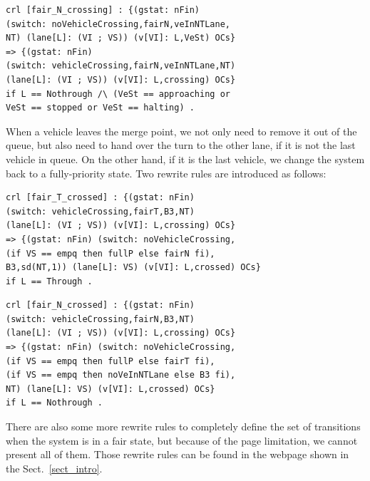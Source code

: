 \documentclass[10pt, conference, compsocconf]{IEEEtran}
\begin{document}
\begin{small}
	\begin{verbatim}
crl [fair_N_crossing] : {(gstat: nFin) 
(switch: noVehicleCrossing,fairN,veInNTLane,
NT) (lane[L]: (VI ; VS)) (v[VI]: L,VeSt) OCs} 
=> {(gstat: nFin) 
(switch: vehicleCrossing,fairN,veInNTLane,NT) 
(lane[L]: (VI ; VS)) (v[VI]: L,crossing) OCs} 
if L == Nothrough /\ (VeSt == approaching or 
VeSt == stopped or VeSt == halting) .
\end{verbatim}
\end{small}

When a vehicle leaves the merge point, we not only need to remove it out of the queue, but also need to hand over the turn to the other lane, if it is not the last vehicle in queue.
On the other hand, if it is the last vehicle, we change the system back to a fully-priority state.
Two rewrite rules are introduced as follows:

\begin{small}
\begin{verbatim}
crl [fair_T_crossed] : {(gstat: nFin) 
(switch: vehicleCrossing,fairT,B3,NT) 
(lane[L]: (VI ; VS)) (v[VI]: L,crossing) OCs} 
=> {(gstat: nFin) (switch: noVehicleCrossing,
(if VS == empq then fullP else fairN fi), 
B3,sd(NT,1)) (lane[L]: VS) (v[VI]: L,crossed) OCs} 
if L == Through .
\end{verbatim}
\end{small}

\begin{small}
	\begin{verbatim}
crl [fair_N_crossed] : {(gstat: nFin) 
(switch: vehicleCrossing,fairN,B3,NT) 
(lane[L]: (VI ; VS)) (v[VI]: L,crossing) OCs} 
=> {(gstat: nFin) (switch: noVehicleCrossing,
(if VS == empq then fullP else fairT fi), 
(if VS == empq then noVeInNTLane else B3 fi),
NT) (lane[L]: VS) (v[VI]: L,crossed) OCs} 
if L == Nothrough .
\end{verbatim}
\end{small}

There are also some more rewrite rules to completely define the set of transitions when the system is in a fair state, but because of the page limitation, we cannot present all of them.
Those rewrite rules can be found in the webpage shown in the Sect.~\ref{sect_intro}.
\end{document}
